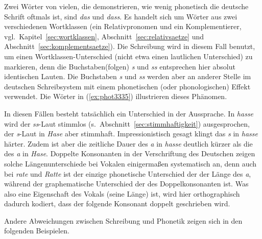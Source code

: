 \newpage

Zwei Wörter von vielen, die demonstrieren, wie wenig phonetisch die deutsche Schrift oftmals ist, sind \textit{das} und \textit{dass}.
Es handelt sich um Wörter aus zwei verschiedenen Wortklassen (ein Relativpronomen und ein Komplementierer, vgl.\ Kapitel~\ref{sec:wortklassen}, Abschnitt~\ref{sec:relativsaetze} und Abschnitt~\ref{sec:komplementsaetze}).
Die Schreibung wird in diesem Fall benutzt, um einen Wortklassen-Unterschied (nicht etwa einen lautlichen Unterschied) zu markieren, denn die Buchstaben(folgen) \textit{s} und \textit{ss} entsprechen hier absolut identischen Lauten.
Die Buchstaben \textit{s} und \textit{ss} werden aber an anderer Stelle im deutschen Schreibsystem mit einem phonetischen (oder phonologischen) Effekt verwendet.
Die Wörter in (\ref{ex:phot3335}) illustrieren dieses Phänomen.

\begin{exe}
  \ex\label{ex:phot3335}
  \begin{xlist}
  \end{xlist}
\end{exe}

In diesen Fällen besteht tatsächlich ein Unterschied in der Aussprache.
In \textit{hasse} wird der \textit{ss}-Laut stimmlos (s.\ Abschnitt~\ref{sec:stimmhaftigkeit}) ausgesprochen, der \textit{s}-Laut in \textit{Hase} aber stimmhaft.
Impressionistisch gesagt klingt das \textit{s} in \textit{hasse} härter.
Zudem ist aber die zeitliche Dauer des \textit{a} in \textit{hasse} deutlich kürzer als die des \textit{a} in \textit{Hase}.
Doppelte Konsonanten in der Verschriftung des Deutschen zeigen solche Längenunterschiede bei Vokalen einigermaßen systematisch an, denn auch bei \textit{rate} und \textit{Ratte} ist der einzige phonetische Unterschied der der Länge des \textit{a}, während der graphematische Unterschied der des Doppelkonsonanten ist.
Was also eine Eigenschaft des Vokals (seine Länge) ist, wird hier orthographisch dadurch kodiert, dass der folgende Konsonant doppelt geschrieben wird.

Andere Abweichungen zwischen Schreibung und Phonetik zeigen sich in den folgenden Beispielen.

\begin{exe}
  \ex
  \begin{xlist}
  \end{xlist}
\end{exe}

